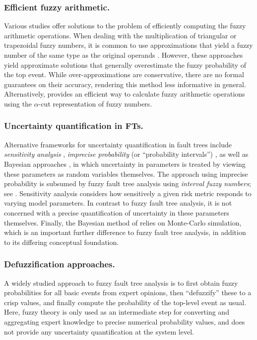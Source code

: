 \documentclass[runningheads]{llncs}
\renewcommand{\emph}[1]{{\it #1}}
\begin{document}
\subsubsection{Efficient fuzzy arithmetic.} Various studies 
offer solutions to the problem of efficiently computing the fuzzy arithmetic operations. 
When dealing with the multiplication of triangular or trapezoidal fuzzy numbers, it is common to use approximations that yield a fuzzy number of the same type as the original operands \cite{tanaka1983fault,peng2008approach,Liang1993FFTA}. 
However, these approaches yield approximate solutions that  generally overestimate the fuzzy probability of the top event. 
While over-approximations are conservative, 
there are no formal guarantees on their accuracy, rendering this method less informative in general. 
Alternatively, \cite{DSW1985fuzzy} provides an efficient way to calculate fuzzy arithmetic operations using the $\alpha$-cut representation of fuzzy numbers.

\subsubsection{Uncertainty quantification in FTs.}
Alternative frameworks for uncertainty quantification in fault trees include \emph{sensitivity analysis} \cite{ruijters2015FTA,rushdi1985uncertainty}, 
\emph{imprecise probability} (or ``probability intervals'') \cite{jacob2011uncertainty,jacob2012imprecise}, 
as well as Bayesian approaches \cite{prabhu2020uncertainty}, in which uncertainty in parameters is treated by viewing these parameters as random variables themselves. 
The approach using imprecise probability is subsumed by fuzzy fault tree analysis using \emph{interval fuzzy numbers}; see . Sensitivity analysis considers how sensitively a given risk metric responds to varying model parameters. In contrast to fuzzy fault tree analysis, it is not concerned with a precise quantification of uncertainty in these parameters themselves. Finally, the Bayesian method of \cite{prabhu2020uncertainty} relies on Monte-Carlo simulation, which is an important further difference to fuzzy fault tree analysis, in addition to its differing conceptual foundation.

\subsubsection{Defuzzification approaches.}
A widely studied approach \cite{lin1997hybridFTA,KUMAR2022ffta} to fuzzy fault tree analysis
is to first obtain fuzzy probabilities for all basic events from expert opinions, then ``defuzzify'' these to a crisp values, and finally compute the probability of the top-level event as usual.  
Here, fuzzy theory is only used as an intermediate step for converting and aggregating expert knowledge to precise numerical probability values, and does not provide any uncertainty quantification at the system level.
\end{document}
